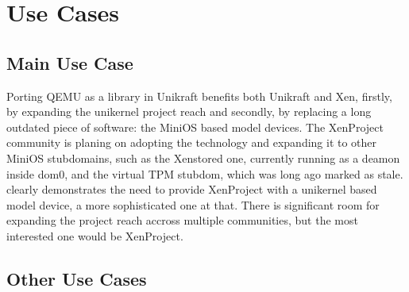 \chapter{Use Cases}
\label{chapter:use-cases}

\section{Main Use Case}
\label{sec:main-use-case}

Porting QEMU as a library in Unikraft benefits both Unikraft and Xen, firstly, by expanding the unikernel project reach and secondly, by replacing a long outdated piece of software: the MiniOS based model devices.
The XenProject community is planing on adopting the technology and expanding it to other MiniOS stubdomains, such as the Xenstored one, currently running as a deamon inside dom0, and the virtual TPM stubdom, which was long ago marked as stale.
 clearly demonstrates the need to provide XenProject with a unikernel based model device, a more sophisticated one at that.
There is significant room for expanding the project reach accross multiple communities, but the most interested one would be XenProject.


\section{Other Use Cases}
\label{sec:other-use-cases}
